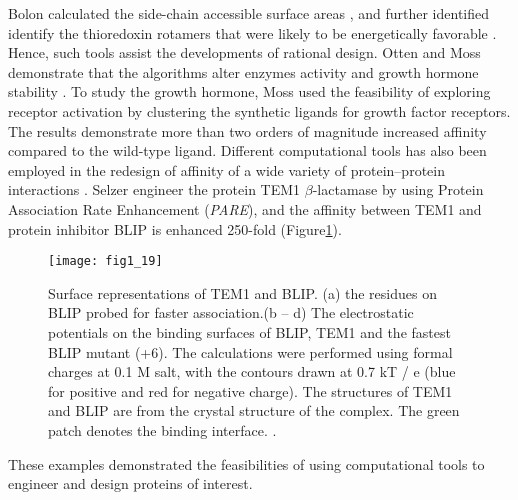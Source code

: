 \begin{refsection}
Bolon  calculated the side-chain accessible surface areas
\cite{Connolly1983}, and further identified identify the thioredoxin rotamers
that were likely to be energetically favorable \cite{Bolon2003}. Hence, such
tools assist the developments of rational design. Otten  and
Moss  demonstrate that the algorithms alter enzymes activity
\cite{Otten2010a} and growth hormone stability \cite{Moss2009,Lippow2007a}. To
study the growth hormone, Moss  used  the feasibility of
exploring receptor activation by clustering the synthetic ligands for growth
factor receptors. The results demonstrate more than two orders of magnitude
increased affinity compared to the wild-type ligand. Different computational
tools has also been employed in the redesign of affinity of a wide variety of
protein–protein interactions \cite{Selzer2000,Reina2002}. Selzer 
engineer the protein TEM1 $\beta$-lactamase by using Protein Association Rate
Enhancement (\emph{PARE}), and the affinity between TEM1 and protein inhibitor
BLIP is enhanced 250-fold \cite{Selzer2000} (Figure\ref{fig:tem1}).
\begin{figure}[htbp] \centering \texttt{[image: fig1\_19]}
    \caption[Surface representations of TEM1 and BLIP. (a) the residues on BLIP
        probed for faster association.(b – d) The electrostatic potentials on
        the binding surfaces of BLIP, TEM1 and the fastest BLIP mutant (+6).
        The calculations were performed using formal charges at 0.1 M salt,
        with the contours drawn at 0.7 kT / e (blue for positive and red for
        negative charge). The structures of TEM1 and BLIP are from the crystal
        structure of the complex. The green patch denotes the binding
    interface.]{Surface representations of TEM1 and BLIP. (a) the residues on
        BLIP probed for faster association.(b – d) The electrostatic potentials
        on the binding surfaces of BLIP, TEM1 and the fastest BLIP mutant (+6).
        The calculations were performed using formal charges at 0.1 M salt,
        with the contours drawn at 0.7 kT / e (blue for positive and red for
        negative charge). The structures of TEM1 and BLIP are from the crystal
        structure of the complex. The green patch denotes the binding
        interface. \cite{Selzer2000}.} \label{fig:tem1} 
\end{figure}

These examples demonstrated the feasibilities of using computational tools to
engineer and design proteins of interest. 


\end{refsection}

